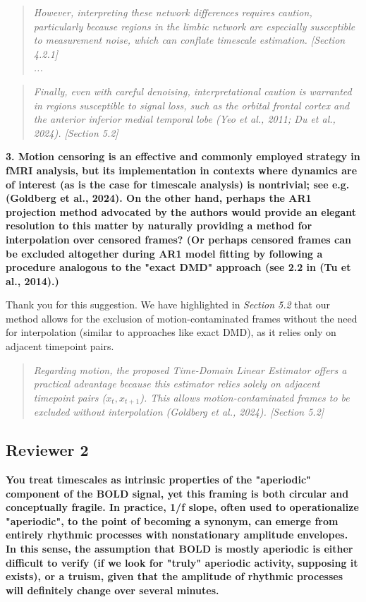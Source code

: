 \documentclass[docs/main.tex]{subfiles}
\newcommand{\reviewercomment}[1]{\vspace{0.3cm}\noindent\textbf{#1}\vspace{0.15cm}}
\newcommand{\manuscriptquote}[1]{\begin{quote}\textit{#1}\end{quote}}
\begin{document}
\manuscriptquote{However, interpreting these network differences requires caution, particularly because regions in the limbic network are especially susceptible to measurement noise, which can conflate timescale estimation. [Section 4.2.1]\\...}

\manuscriptquote{Finally, even with careful denoising, interpretational caution is warranted in regions susceptible to signal loss, such as the orbital frontal cortex and the anterior inferior medial temporal lobe (Yeo et al., 2011; Du et al., 2024). [Section 5.2]}

\reviewercomment{3. Motion censoring is an effective and commonly employed strategy in fMRI analysis, but its implementation in contexts where dynamics are of interest (as is the case for timescale analysis) is nontrivial; see e.g. (Goldberg et al., 2024). On the other hand, perhaps the AR1 projection method advocated by the authors would provide an elegant resolution to this matter by naturally providing a method for interpolation over censored frames? (Or perhaps censored frames can be excluded altogether during AR1 model fitting by following a procedure analogous to the "exact DMD" approach (see 2.2 in (Tu et al., 2014).)}

Thank you for this suggestion. We have highlighted in \textit{Section 5.2} that our method allows for the exclusion of motion-contaminated frames without the need for interpolation (similar to approaches like exact DMD), as it relies only on adjacent timepoint pairs.

\manuscriptquote{Regarding motion, the proposed Time-Domain Linear Estimator offers a practical advantage because this estimator relies solely on adjacent timepoint pairs ($x_t, x_{t+1}$). This allows motion-contaminated frames to be excluded without interpolation (Goldberg et al., 2024). [Section 5.2]}

\subsection*{Reviewer 2}

\reviewercomment{You treat timescales as intrinsic properties of the "aperiodic" component of the BOLD signal, yet this framing is both circular and conceptually fragile. In practice, 1/f slope, often used to operationalize "aperiodic", to the point of becoming a synonym, can emerge from entirely rhythmic processes with nonstationary amplitude envelopes. In this sense, the assumption that BOLD is mostly aperiodic is either difficult to verify (if we look for "truly" aperiodic activity, supposing it exists), or a truism, given that the amplitude of rhythmic processes will definitely change over several minutes.}
\end{document}
